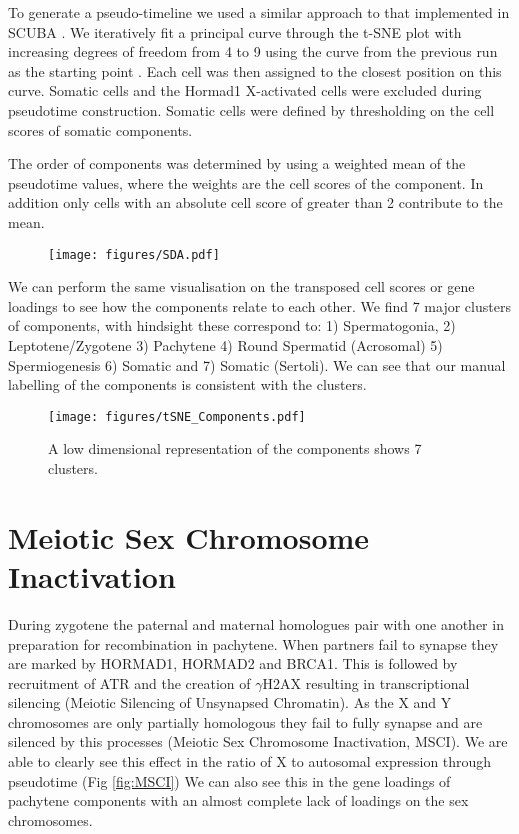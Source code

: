 To generate a pseudo-timeline we used a similar approach to that implemented in SCUBA \cite{Marco2014-ky}. We iteratively fit a principal curve through the t-SNE plot with increasing degrees of freedom from 4 to 9 using the curve from the previous run as the starting point \cite{Hastie1989-ej}. Each cell was then assigned to the closest position on this curve. Somatic cells and the Hormad1 X-activated cells were excluded during pseudotime construction. Somatic cells were defined by thresholding on the cell scores of somatic components.

The order of components was determined by using a weighted mean of the pseudotime values, where the weights are the cell scores of the component. In addition only cells with an absolute cell score of greater than 2 contribute to the mean.

\begin{figure}[H]
	\centering
	\texttt{[image: figures/SDA.pdf]}
	\caption{}
	\label{fig:SDA}
\end{figure}

We can perform the same visualisation on the transposed cell scores or gene loadings to see how the components relate to each other. We find 7 major clusters of components, with hindsight these correspond to: 1) Spermatogonia, 2) Leptotene/Zygotene 3) Pachytene 4) Round Spermatid (Acrosomal) 5) Spermiogenesis 6) Somatic and 7) Somatic (Sertoli). We can see that our manual labelling of the components is consistent with the clusters.

\begin{figure}[H]
	\centering
	\texttt{[image: figures/tSNE\_Components.pdf]}
	\caption{A low dimensional representation of the components shows 7 clusters.}
	\label{fig:tSNE_Components}
\end{figure}


\section{Meiotic Sex Chromosome Inactivation}
During zygotene the paternal and maternal homologues pair with one another in preparation for recombination in pachytene. When partners fail to synapse they are marked by HORMAD1, HORMAD2 and BRCA1. This is followed by recruitment of ATR and the creation of $\gamma$H2AX resulting in transcriptional silencing (Meiotic Silencing of Unsynapsed Chromatin). As the X and Y chromosomes are only partially homologous they fail to fully synapse and are silenced by this processes (Meiotic Sex Chromosome Inactivation, MSCI). We are able to clearly see this effect in the ratio of X to autosomal expression through pseudotime (Fig \ref{fig:MSCI}) We can also see this in the gene loadings of pachytene components with an almost complete lack of loadings on the sex chromosomes.

